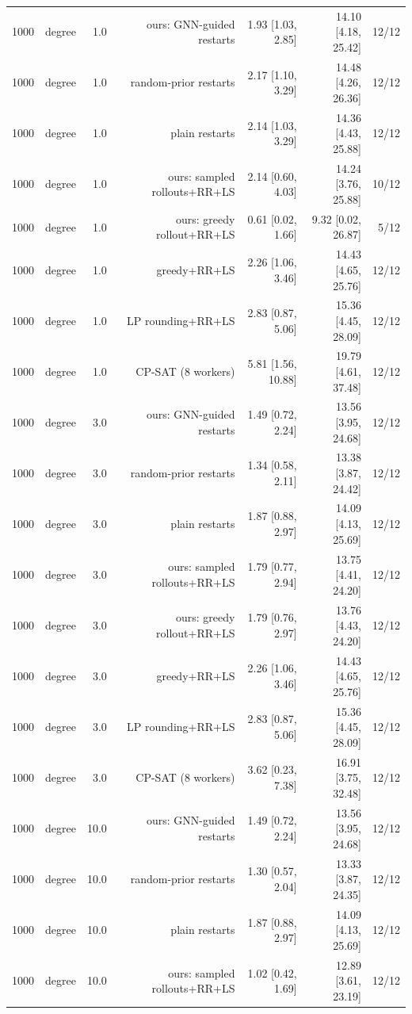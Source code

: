 \begin{table}[t]
\begin{tabular}{llrrrrr}
1000 & degree & 1.0 & ours: GNN-guided restarts & 1.93 [1.03, 2.85] & 14.10 [4.18, 25.42] & 12/12 \\
1000 & degree & 1.0 & random-prior restarts & 2.17 [1.10, 3.29] & 14.48 [4.26, 26.36] & 12/12 \\
1000 & degree & 1.0 & plain restarts & 2.14 [1.03, 3.29] & 14.36 [4.43, 25.88] & 12/12 \\
1000 & degree & 1.0 & ours: sampled rollouts+RR+LS & 2.14 [0.60, 4.03] & 14.24 [3.76, 25.88] & 10/12 \\
1000 & degree & 1.0 & ours: greedy rollout+RR+LS & 0.61 [0.02, 1.66] & 9.32 [0.02, 26.87] & 5/12 \\
1000 & degree & 1.0 & greedy+RR+LS & 2.26 [1.06, 3.46] & 14.43 [4.65, 25.76] & 12/12 \\
1000 & degree & 1.0 & LP rounding+RR+LS & 2.83 [0.87, 5.06] & 15.36 [4.45, 28.09] & 12/12 \\
1000 & degree & 1.0 & CP-SAT (8 workers) & 5.81 [1.56, 10.88] & 19.79 [4.61, 37.48] & 12/12 \\
1000 & degree & 3.0 & ours: GNN-guided restarts & 1.49 [0.72, 2.24] & 13.56 [3.95, 24.68] & 12/12 \\
1000 & degree & 3.0 & random-prior restarts & 1.34 [0.58, 2.11] & 13.38 [3.87, 24.42] & 12/12 \\
1000 & degree & 3.0 & plain restarts & 1.87 [0.88, 2.97] & 14.09 [4.13, 25.69] & 12/12 \\
1000 & degree & 3.0 & ours: sampled rollouts+RR+LS & 1.79 [0.77, 2.94] & 13.75 [4.41, 24.20] & 12/12 \\
1000 & degree & 3.0 & ours: greedy rollout+RR+LS & 1.79 [0.76, 2.97] & 13.76 [4.43, 24.20] & 12/12 \\
1000 & degree & 3.0 & greedy+RR+LS & 2.26 [1.06, 3.46] & 14.43 [4.65, 25.76] & 12/12 \\
1000 & degree & 3.0 & LP rounding+RR+LS & 2.83 [0.87, 5.06] & 15.36 [4.45, 28.09] & 12/12 \\
1000 & degree & 3.0 & CP-SAT (8 workers) & 3.62 [0.23, 7.38] & 16.91 [3.75, 32.48] & 12/12 \\
1000 & degree & 10.0 & ours: GNN-guided restarts & 1.49 [0.72, 2.24] & 13.56 [3.95, 24.68] & 12/12 \\
1000 & degree & 10.0 & random-prior restarts & 1.30 [0.57, 2.04] & 13.33 [3.87, 24.35] & 12/12 \\
1000 & degree & 10.0 & plain restarts & 1.87 [0.88, 2.97] & 14.09 [4.13, 25.69] & 12/12 \\
1000 & degree & 10.0 & ours: sampled rollouts+RR+LS & 1.02 [0.42, 1.69] & 12.89 [3.61, 23.19] & 12/12 \\

\end{tabular}
\end{table}
